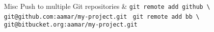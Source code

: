 \documentclass[10pt,english,landscape]{article}
\makeatletter
\renewcommand{\section}{\@startsection{section}{1}{0mm}%
{-1ex plus -.5ex minus -.2ex}%
{0.5ex plus .2ex}%
{\normalfont\large\bfseries}}
\makeatother
\begin{document}
\begin{multicols}{2}
    \begin{keys}{Misc}
      Push to multiple Git repositories &
      \texttt{git remote add github \textbackslash \newline}
      \hspace*{0.5cm} \texttt{git@github.com:aamar/my-project.git \newline}
      \texttt{git remote add bb \textbackslash \newline}
      \hspace*{0.5cm} \texttt{git@bitbucket.org:aamar/my-project.git} \\
    \end{keys}
%
%
%
%
%
%

  \end{multicols}

  
\end{document}
